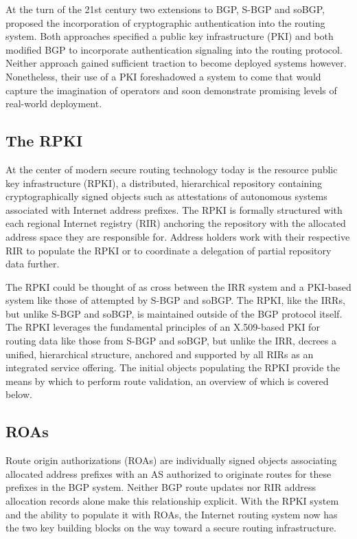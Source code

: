 \documentclass[sigconf]{acmart}
\begin{document}
At the turn of the 21st century two extensions to BGP, S-BGP and soBGP,
proposed the incorporation of cryptographic authentication into the
routing system.\cite{kent_secure_2000}\cite{white_securing_2003}  Both
approaches specified a public key infrastructure (PKI) and both modified
BGP to incorporate authentication signaling into the routing protocol.
Neither approach gained sufficient traction to become deployed systems
however.  Nonetheless, their use of a PKI foreshadowed a system to come
that would capture the imagination of operators and soon demonstrate
promising levels of real-world deployment.

\subsection{The RPKI}

At the center of modern secure routing technology today is the resource
public key infrastructure (RPKI), a distributed, hierarchical repository
containing cryptographically signed objects such as attestations of
autonomous systems associated with Internet address
prefixes.\cite{lepinski_infrastructure_2012}  The RPKI is formally
structured with each regional Internet registry (RIR) anchoring the
repository with the allocated address space they are responsible for.
Address holders work with their respective RIR to populate the RPKI or
to coordinate a delegation of partial repository data further.

The RPKI could be thought of as cross between the IRR system and a
PKI-based system like those of attempted by S-BGP and soBGP.  The RPKI,
like the IRRs, but unlike S-BGP and soBGP, is maintained outside of the
BGP protocol itself.  The RPKI leverages the fundamental principles of
an X.509-based PKI for routing data like those from S-BGP and soBGP, but
unlike the IRR, decrees a unified, hierarchical structure, anchored and
supported by all RIRs as an integrated service offering.  The initial
objects populating the RPKI provide the means by which to perform route
validation, an overview of which is covered below.

\subsection{ROAs}

Route origin authorizations (ROAs) are individually signed objects
associating allocated address prefixes with an AS authorized to
originate routes for these prefixes in the BGP system.  Neither BGP
route updates nor RIR address allocation records alone make this
relationship explicit.  With the RPKI system and the ability to populate
it with ROAs, the Internet routing system now has the two key building
blocks on the way toward a secure routing infrastructure.
\end{document}
